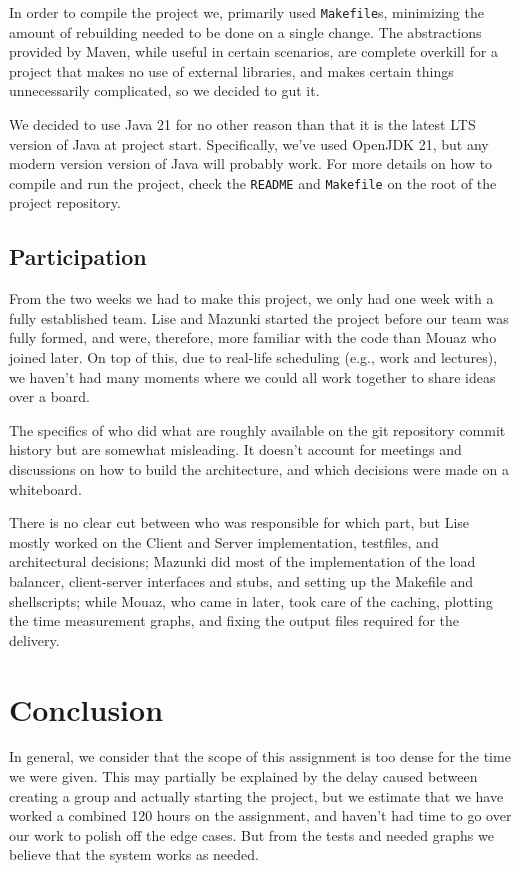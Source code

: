 \documentclass{article}
\def\code#1{\colorbox{gray!20}{\texttt{#1}}}
\begin{document}
In order to compile the project we, primarily used \code{Makefile}s, minimizing the amount of rebuilding needed to be done on a single change. The abstractions provided by Maven, while useful in certain scenarios, are complete overkill for a project that makes no use of external libraries, and makes certain things unnecessarily complicated, so we decided to gut it.

We decided to use Java 21 for no other reason than that it is the latest LTS version of Java at project start. Specifically, we've used OpenJDK 21, but any modern version version of Java will probably work. For more details on how to compile and run the project, check the \code{README} and \code{Makefile} on the root of the project repository. 

\subsection{Participation}
From the two weeks we had to make this project, we only had one week with a fully established team. Lise and Mazunki started the project before our team was fully formed, and were, therefore, more familiar with the code than Mouaz who joined later. On top of this, due to real-life scheduling (e.g., work and lectures), we haven't had many moments where we could all work together to share ideas over a board.

The specifics of who did what are roughly available on the git repository commit history but are somewhat misleading. It doesn't account for meetings and discussions on how to build the architecture, and which decisions were made on a whiteboard.

There is no clear cut between who was responsible for which part, but Lise mostly worked on the Client and Server implementation, testfiles, and architectural decisions; Mazunki did most of the implementation of the load balancer, client-server interfaces and stubs, and setting up the Makefile and shellscripts; while Mouaz, who came in later, took care of the caching, plotting the time measurement graphs, and fixing the output files required for the delivery.

\section{Conclusion}
In general, we consider that the scope of this assignment is too dense for the time we were given. This may partially be explained by the delay caused between creating a group and actually starting the project, but we estimate that we have worked a combined 120 hours on the assignment, and haven't had time to go over our work to polish off the edge cases. But from the tests and needed graphs we believe that the system works as needed.
\end{document}
